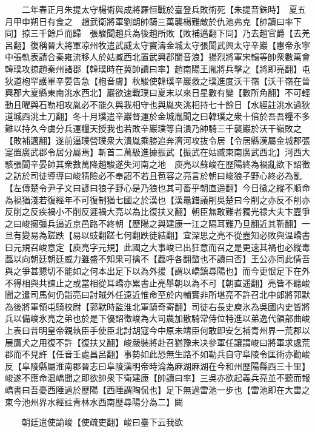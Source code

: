 　　二年春正月朱提太守楊術與成將羅恒戰於臺登兵敗術死【朱提音銖時】　夏五月甲申朔日有食之　趙武衛將軍劉朗帥騎三萬襲楊難敵於仇池弗克【帥讀曰率下同】掠三千餘戶而歸　張駿聞趙兵為後趙所敗【敗補邁翻下同】乃去趙官爵【去羌呂翻】復稱晉大將軍凉州牧遣武威太守竇濤金城太守張閬武興太守辛巖【惠帝永寜中張軌表請合秦雍流移人於姑臧西北置武興郡閬音浪】揚烈將軍宋輯等帥衆數萬會韓璞攻掠趙秦州諸郡【韓璞時在冀帥讀曰率】趙南陽王胤將兵擊之【將即亮翻】屯狄道枹罕護軍辛晏告急【枹音膚】秋駿使韓璞辛巖救之璞進度沃干嶺【沃干嶺在晉興郡大夏縣東南洮水西北】巖欲速戰璞曰夏末以來日星數有變【數所角翻】不可輕動且曜與石勒相攻胤必不能久與我相守也與胤夾洮相持七十餘日【水經註洮水過狄道城西洮土刀翻】冬十月璞遣辛巖督運於金城胤聞之曰韓璞之衆十倍於吾吾糧不多難以持久今虜分兵運糧天授我也若敗辛巖璞等自潰乃帥騎三千襲巖於沃干嶺敗之【敗補邁翻】遂前逼璞營璞衆大潰胤乘勝追奔濟河攻抜令居【令居縣漢屬金城郡張寔置廣武郡令居分屬焉】斬首二萬級進據振武【振武在姑臧東南廣武西北】河西大駭張閬辛晏帥其衆數萬降趙駿遂失河南之地　庾亮以蘇峻在歷陽終為禍亂欲下詔徵之訪於司徒導導曰峻猜險必不奉詔不若且苞容之亮言於朝曰峻狼子野心終必為亂【左傳楚令尹子文曰諺曰狼子野心是乃狼也其可畜乎朝直遥翻】今日徵之縱不順命為禍猶淺若復經年不可復制猶七國之於漢也【漢鼂錯議削吳楚曰今削之亦反不削亦反削之反疾禍小不削反遲禍大亮以為比復扶又翻】朝臣無敢難者獨光禄大夫卞壼爭之曰峻擁彊兵逼近京邑路不終朝【歷陽之與建康一江之隔耳難乃旦翻近其靳翻】一旦有變易為蹉跌【易以豉翻蹉七何翻跌徒結翻】宜深思之亮不從壼知必敗與温嶠書曰元規召峻意定【庾亮字元規】此國之大事峻已出狂意而召之是更速其禍也必縱毒蠚以向朝廷朝廷威力雖盛不知果可擒不【蠚呼各翻螫也不讀曰否】王公亦同此情吾與之爭甚懇切不能如之何本出足下以為外援【謂以嶠鎮尋陽也】而今更恨足下在外不得相與共諫止之或當相從耳嶠亦累書止亮舉朝以為不可【朝直遥翻】亮皆不聽峻聞之遣司馬何仍詣亮曰討賊外任遠近惟命至於内輔實非所堪亮不許召北中郎將郭默為後將軍領屯騎校尉【郭默時監淮北軍騎奇寄翻】司徒右長史庾氷為吳國内史皆將兵以備峻氷亮之弟也於是下優詔徵峻為大司農加散騎常侍位特進以弟逸代領部曲峻上表曰昔明皇帝親執臣手使臣北討胡寇今中原未靖臣何敢即安乞補青州界一荒郡以展鷹犬之用復不許【復扶又翻】峻嚴裝將赴召猶豫未决參軍任讓謂峻曰將軍求處荒郡而不見許【任音壬處昌呂翻】事勢如此恐無生路不如勒兵自守阜陵令匡術亦勸峻反【阜陵縣屬淮南郡晉志曰阜陵漢明帝時淪為麻湖麻湖在今和州歷陽縣西三十里】峻遂不應命温嶠聞之即欲帥衆下衛建康【帥讀曰率】三吳亦欲起義兵亮並不聽而報嶠書曰吾憂西陲過於歷陽【西陲謂陶侃也】足下無過雷池一步也【雷池即在大雷之東今池州界水經註青林水西南歷尋陽分為二】闕

　　朝廷遣使諭峻【使疏吏翻】峻曰臺下云我欲

